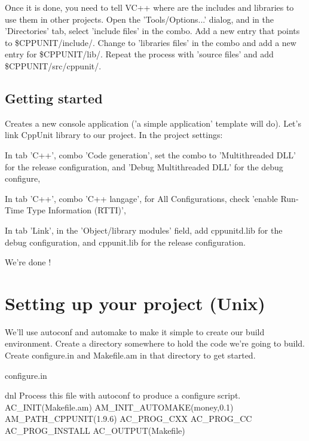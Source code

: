 Once it is done, you need to tell VC++ where are the includes and libraries to use them in other projects. Open the 'Tools/Options...' dialog, and in the 'Directories' tab, select 'include files' in the combo. Add a new entry that points to \$CPPUNIT/include/. Change to 'libraries files' in the combo and add a new entry for \$CPPUNIT/lib/. Repeat the process with 'source files' and add \$CPPUNIT/src/cppunit/.\hypertarget{money_example_sec_getting_started}{}\subsection{Getting started}\label{money_example_sec_getting_started}
Creates a new console application ('a simple application' template will do). Let's link CppUnit library to our project. In the project settings:
\begin{DoxyItemize}
\item In tab 'C++', combo 'Code generation', set the combo to 'Multithreaded DLL' for the release configuration, and 'Debug Multithreaded DLL' for the debug configure,
\item In tab 'C++', combo 'C++ langage', for All Configurations, check 'enable Run-\/Time Type Information (RTTI)',
\item In tab 'Link', in the 'Object/library modules' field, add cppunitd.lib for the debug configuration, and cppunit.lib for the release configuration.
\end{DoxyItemize}

We're done !\hypertarget{money_example_sec_setting_unix}{}\section{Setting up your project (Unix)}\label{money_example_sec_setting_unix}
We'll use {\ttfamily autoconf} and {\ttfamily automake} to make it simple to create our build environment. Create a directory somewhere to hold the code we're going to build. Create {\ttfamily configure.in} and {\ttfamily Makefile.am} in that directory to get started.

{\ttfamily configure.in} \begin{DoxyVerb}
dnl Process this file with autoconf to produce a configure script.
AC_INIT(Makefile.am)
AM_INIT_AUTOMAKE(money,0.1)
AM_PATH_CPPUNIT(1.9.6)
AC_PROG_CXX
AC_PROG_CC
AC_PROG_INSTALL
AC_OUTPUT(Makefile)\end{DoxyVerb}



